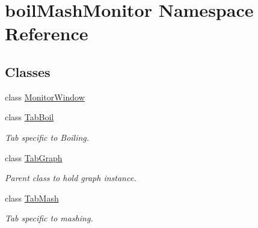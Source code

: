 \hypertarget{namespaceboil_mash_monitor}{}\section{boil\+Mash\+Monitor Namespace Reference}
\label{namespaceboil_mash_monitor}
\subsection*{Classes}
\begin{DoxyCompactItemize}
\item 
class \mbox{\hyperlink{classboil_mash_monitor_1_1_monitor_window}{Monitor\+Window}}
\item 
class \mbox{\hyperlink{classboil_mash_monitor_1_1_tab_boil}{Tab\+Boil}}
\begin{DoxyCompactList}\small\item\em Tab specific to Boiling. \end{DoxyCompactList}\item 
class \mbox{\hyperlink{classboil_mash_monitor_1_1_tab_graph}{Tab\+Graph}}
\begin{DoxyCompactList}\small\item\em Parent class to hold graph instance. \end{DoxyCompactList}\item 
class \mbox{\hyperlink{classboil_mash_monitor_1_1_tab_mash}{Tab\+Mash}}
\begin{DoxyCompactList}\small\item\em Tab specific to mashing. \end{DoxyCompactList}\end{DoxyCompactItemize}
